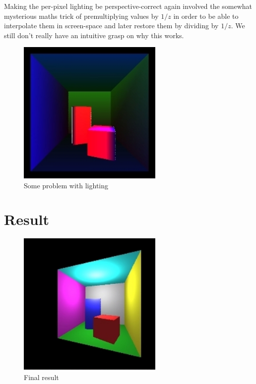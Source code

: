 \documentclass[a4paper,11pt]{article}
\begin{document}
Making the per-pixel lighting be perspective-correct again involved the somewhat mysterious maths trick of 
premultiplying values by $1/z$ in order to be able to interpolate them in screen-space and later 
restore them by dividing by $1/z$. We still don't really have an intuitive grasp on why this works.

\begin{figure}[H]
\begin{center}
\includegraphics[width=7cm]{lighterror.jpg}
\caption{Some problem with lighting}
\end{center}
\end{figure}
\vspace{-0.5cm}

\section*{Result}

\begin{figure}[H]
\begin{center}
\includegraphics[width=7cm]{light.jpg}
\caption{Final result}
\end{center}
\end{figure}
\vspace{-0.5cm}
\end{document}
